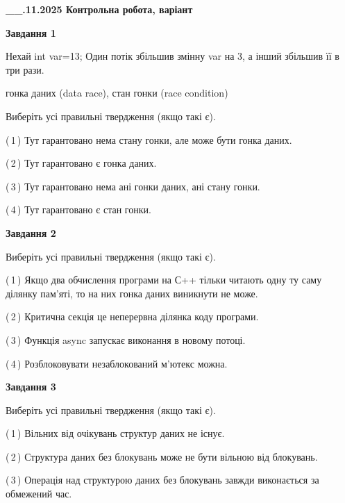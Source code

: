 \documentclass[12pt, ukrainian]{article}
\begin{document}
\begin {large}

\textbf{\_\_.11.2025 Контрольна робота, варіант  }\par


{

\begin{center}
\textbf{Завдання 1}
\end{center}
Нехай int var=13; Один потік збільшив змінну var на 3, а інший збільшив її в три рази.

гонка даних (data race), стан гонки (race condition)

Виберіть усі правильні твердження (якщо такі є).\par
\vspace{2mm}
(\,1\,) Тут гарантовано нема стану гонки, але може бути гонка даних.%

(\,2\,) Тут гарантовано є гонка даних.%

(\,3\,) Тут гарантовано нема ані гонки даних, ані стану гонки.%

(\,4\,) Тут гарантовано є стан гонки.%



\begin{center}
\textbf{Завдання 2}
\end{center}
Виберіть усі правильні твердження (якщо такі є).\par
\vspace{2mm}

(\,1\,) Якщо два обчислення програми на С++ тільки читають одну ту саму ділянку пам'яті, то на них гонка даних  виникнути не може.%

(\,2\,) Критична секція це неперервна ділянка коду програми.%

(\,3\,) Функція async запускає виконання в новому потоці.%

(\,4\,) Розблоковувати незаблокований м’ютекс можна.%



\begin{center}
\textbf{Завдання 3}
\end{center}
Виберіть усі правильні твердження (якщо такі є).\par
\vspace{2mm}

(\,1\,) Вільних від очікувань структур даних не існує.%

(\,2\,) Структура даних без блокувань може не бути вільною від блокувань.%

(\,3\,) Операція над структурою даних без блокувань завжди виконається за обмежений час.%

}
\end{large}
\end{document}
